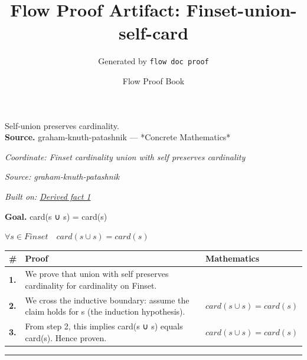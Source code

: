 \documentclass[11pt]{article}
\title{Flow Proof Artifact: Finset-union-self-card}
\author{Generated by \texttt{flow doc proof}}
\date{Flow Proof Book}
\theoremstyle{definition}
\begin{document}
\maketitle
Self-union preserves cardinality.\\[0.5em]
\textbf{Source.} graham-knuth-patashnik — *Concrete Mathematics*\\[0.5em]
\bigskip
{}\par
\smallskip\noindent\textit{Coordinate: Finset \cdot cardinality \cdot union with self preserves cardinality}\par
\smallskip\noindent\textit{Source: graham-knuth-patashnik}\par
\smallskip\noindent\textit{Built on: \hyperref[thm:Finset-cardinality-union_with_self_preserves_cardinality]{Derived fact 1}}\par
\medskip
\noindent\textbf{Goal.} card(s ∪ s) = card(s)\par
\noindent$\displaystyle \forall s \in Finset\quad card(s ∪ s) = card(s)$\par
\medskip
\noindent
\begin{tabular}{@{} >{\raggedright\arraybackslash}p{} >{\raggedright\arraybackslash}p{} >{\raggedleft\arraybackslash}p{} @{}}
\textbf{\#} & \textbf{Proof} & \textbf{Mathematics} \\
\midrule
\textbf{1.} & We prove that union with self preserves cardinality for cardinality on Finset. & \\[0.45em]
\textbf{2.} & We cross the inductive boundary: assume the claim holds for s (the induction hypothesis). & $\displaystyle card(s ∪ s) = card(s)$ \\[0.45em]
\textbf{3.} & From step 2, this implies card(s ∪ s) equals card(s). Hence proven. & $\displaystyle card(s ∪ s) = card(s)$ \\[0.45em]
\bottomrule
\end{tabular}
\label{thm:Finset-cardinality-union_with_self_preserves_cardinality}
\par\medskip\hrule
\end{document}
